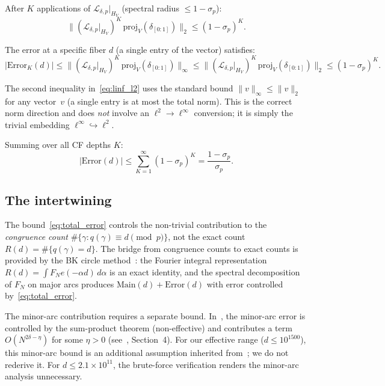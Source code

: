 \documentclass[11pt,a4paper]{amsart}
\theoremstyle{definition}
\begin{document}
After $K$ applications of $\mathcal{L}_{\delta,p}|_{H_V}$ (spectral radius $\leq 1 - \sigma_p$):
\[
\|(\mathcal{L}_{\delta,p}|_{H_V})^K \, \text{proj}_V(\delta_{[0:1]})\|_2 \leq (1-\sigma_p)^K.
\]

The error at a specific fiber $d$ (a single entry of the vector) satisfies:
\begin{equation}\label{eq:linf_l2}
|\text{Error}_K(d)| \leq \|(\mathcal{L}_{\delta,p}|_{H_V})^K \, \text{proj}_V(\delta_{[0:1]})\|_\infty \leq \|(\mathcal{L}_{\delta,p}|_{H_V})^K \, \text{proj}_V(\delta_{[0:1]})\|_2 \leq (1-\sigma_p)^K.
\end{equation}

The second inequality in~\eqref{eq:linf_l2} uses the standard bound $\|v\|_\infty \leq \|v\|_2$ for any vector~$v$ (a single entry is at most the total norm). This is the correct norm direction and does \emph{not} involve an $\ell^2 \to \ell^\infty$ conversion; it is simply the trivial embedding $\ell^\infty \hookrightarrow \ell^2$.

Summing over all CF depths $K$:
\begin{equation}\label{eq:total_error}
|\text{Error}(d)| \leq \sum_{K=1}^{\infty} (1-\sigma_p)^K = \frac{1-\sigma_p}{\sigma_p}.
\end{equation}

\subsection{The intertwining}

The bound~\eqref{eq:total_error} controls the non-trivial contribution to the \emph{congruence count} $\#\{\gamma : q(\gamma) \equiv d \pmod{p}\}$, not the exact count $R(d) = \#\{q(\gamma) = d\}$. The bridge from congruence counts to exact counts is provided by the BK circle method~\cite{BK2014}: the Fourier integral representation $R(d) = \int F_N e(-\alpha d)\, d\alpha$ is an exact identity, and the spectral decomposition of $F_N$ on major arcs produces $\text{Main}(d) + \text{Error}(d)$ with error controlled by~\eqref{eq:total_error}.

The minor-arc contribution requires a separate bound. In~\cite{BK2014}, the minor-arc error is controlled by the sum-product theorem (non-effective) and contributes a term $O(N^{2\delta - \eta})$ for some $\eta > 0$ (see~\cite{BK2014}, Section~4). For our effective range ($d \leq 10^{1500}$), this minor-arc bound is an additional assumption inherited from~\cite{BK2014}; we do not rederive it. For $d \leq 2.1 \times 10^{11}$, the brute-force verification renders the minor-arc analysis unnecessary.
\end{document}
